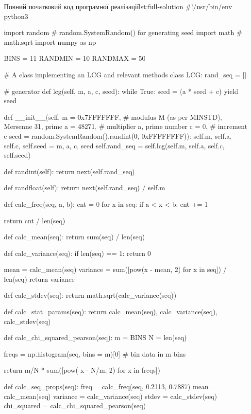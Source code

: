 \documentclass[
	a4paper,
	oneside,
	BCOR = 10mm,
	DIV = 12,
	12pt,
	headings = normal,
]{scrartcl}
\begin{document}
			\begin{listingpython}[toprule = 0pt, bottomrule = 0pt]{Повний початковий код програмної реалізації}{lst:full-solution}
#!/usr/bin/env python3

import random # random.SystemRandom() for generating seed
import math # math.sqrt
import numpy as np

BINS = 11
RANDMIN = 10
RANDMAX = 50

# A class implementing an LCG and relevant methods
class LCG:
    rand_seq = []

    # generator
    def lcg(self, m, a, c, seed):
        while True:
            seed = (a * seed + c) %
            yield seed

    def __init__(self,
                 m = 0x7FFFFFFF, # modulus M (as per MINSTD), Mersenne 31, prime
                 a = 48271, # multiplier a, prime number
                 c = 0, # increment c
                 seed = random.SystemRandom().randint(0, 0xFFFFFFFF)):
        self.m, self.a, self.c, self.seed = m, a, c, seed
        self.rand_seq = self.lcg(self.m, self.a, self.c, self.seed)

    def randint(self):
        return next(self.rand_seq)

    def randfloat(self):
        return next(self.rand_seq) / self.m

def calc_freq(seq, a, b):
    cnt = 0
    for x in seq:
        if a < x < b:
            cnt += 1

    return cnt / len(seq)

def calc_mean(seq):
    return sum(seq) / len(seq)

def calc_variance(seq):
    if len(seq) == 1:
        return 0

    mean = calc_mean(seq)
    variance = sum([pow(x - mean, 2) for x in seq]) / len(seq)
    return variance

def calc_stdev(seq):
    return math.sqrt(calc_variance(seq))

def calc_stat_params(seq):
    return calc_mean(seq), calc_variance(seq), calc_stdev(seq)

def calc_chi_squared_pearson(seq):
    m = BINS
    N = len(seq)

    freqs = np.histogram(seq, bins = m)[0] # bin data in m bins

    return m/N * sum([pow( x - N/m, 2) for x in freqs])

def calc_seq_props(seq):
    freq = calc_freq(seq, 0.2113, 0.7887)
    mean = calc_mean(seq)
    variance = calc_variance(seq)
    stdev = calc_stdev(seq)
    chi_squared = calc_chi_squared_pearson(seq)


\end{listingpython}
\end{document}
